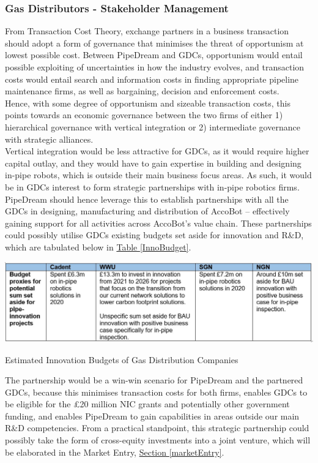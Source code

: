 \documentclass[11pt]{article}		%
\newcommand{\tableref}[1]{\hyperref[#1]{Table \ref*{#1}}}     %
\newcommand{\sectref}[1]{\hyperref[#1]{Section \ref*{#1}}}     %
\begin{document}
        \subsubsection{Gas Distributors - Stakeholder Management}
	    From Transaction Cost Theory, exchange partners in a business transaction should adopt a form of governance that minimises the threat of opportunism at lowest possible cost. Between PipeDream and GDCs, opportunism would entail possible exploiting of uncertainties in how the industry evolves, and transaction costs would entail search and information costs in finding appropriate pipeline maintenance firms, as well as bargaining, decision and enforcement costs. 
         \\ \hspace*{3ex}Hence, with some degree of opportunism and sizeable transaction costs, this points towards an economic governance between the two firms of either 1) hierarchical governance with vertical integration or 2) intermediate governance with strategic alliances. 
         \\ \hspace*{3ex}Vertical integration would be less attractive for GDCs, as it would require higher capital outlay, and they would have to gain expertise in building and designing in-pipe robots, which is outside their main business focus areas. As such, it would be in GDCs interest to form strategic partnerships with in-pipe robotics firms. 
         \\ \hspace*{3ex}PipeDream should hence leverage this to establish partnerships with all the GDCs in designing, manufacturing and distribution of AccoBot – effectively gaining support for all activities across AccoBot’s value chain.  These partnerships could possibly utilise GDCs existing budgets set aside for innovation and R\&D, which are tabulated below in \tableref{InnoBudget}. 
        \begin{table}[H]
					\centering
					\includegraphics[width=\textwidth]{InnoBudget.jpg}
					\caption{Estimated Innovation Budgets of Gas Distribution Companies}
					\label{InnoBudget}
				\end{table}
		The partnership would be a win-win scenario for PipeDream and the partnered GDCs, because this minimises transaction costs for both firms, enables GDCs to be eligible for the £20 million NIC grants and potentially other government funding, and enables PipeDream to gain capabilities in areas outside our main R\&D competencies. From a practical standpoint, this strategic partnership could possibly take the form of cross-equity investments into a joint venture, which will be elaborated in the Market Entry, \sectref{marketEntry}.
		
\end{document}
